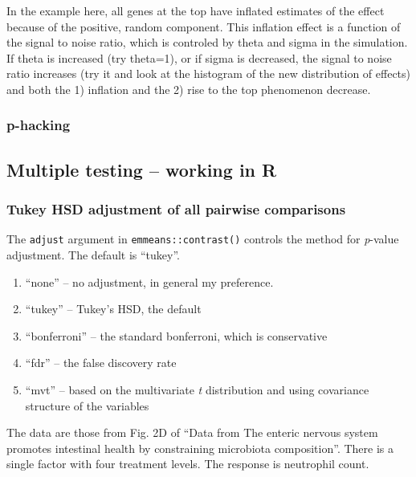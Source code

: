 \documentclass[]{book}
\providecommand{\tightlist}{%
  \setlength{\itemsep}{0pt}\setlength{\parskip}{0pt}}
\begin{document}
In the example here, all genes at the top have inflated estimates of the effect because of the positive, random component. This inflation effect is a function of the signal to noise ratio, which is controled by theta and sigma in the simulation. If theta is increased (try theta=1), or if sigma is decreased, the signal to noise ratio increases (try it and look at the histogram of the new distribution of effects) and both the 1) inflation and the 2) rise to the top phenomenon decrease.

\hypertarget{p-hacking}{%
\subsubsection{p-hacking}\label{p-hacking}}

\hypertarget{multiple-testing-working-in-r}{%
\subsection{Multiple testing -- working in R}\label{multiple-testing-working-in-r}}

\hypertarget{tukey-hsd-adjustment-of-all-pairwise-comparisons}{%
\subsubsection{Tukey HSD adjustment of all pairwise comparisons}\label{tukey-hsd-adjustment-of-all-pairwise-comparisons}}

The \texttt{adjust} argument in \texttt{emmeans::contrast()} controls the method for \emph{p}-value adjustment. The default is ``tukey''.

\begin{enumerate}
\def\labelenumi{\arabic{enumi}.}
\tightlist
\item
  ``none'' -- no adjustment, in general my preference.
\item
  ``tukey'' -- Tukey's HSD, the default
\item
  ``bonferroni'' -- the standard bonferroni, which is conservative
\item
  ``fdr'' -- the false discovery rate
\item
  ``mvt'' -- based on the multivariate \emph{t} distribution and using covariance structure of the variables
\end{enumerate}

The data are those from Fig. 2D of ``Data from The enteric nervous system promotes intestinal health by constraining microbiota composition''. There is a single factor with four treatment levels. The response is neutrophil count.
\end{document}

